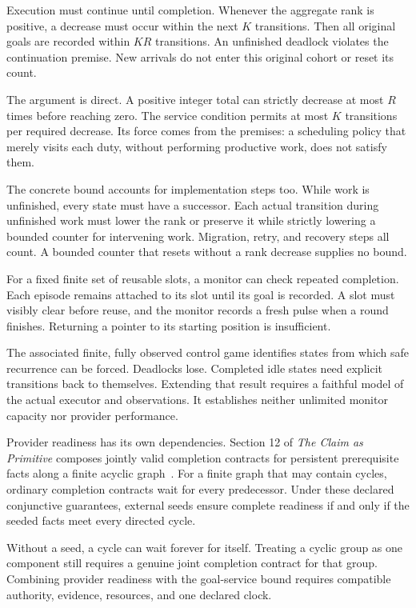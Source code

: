 \documentclass{momentum}
\begin{document}
Execution must continue until completion. Whenever the aggregate rank is positive, a decrease must occur within the next $K$ transitions. Then all original goals are recorded within $KR$ transitions. An unfinished deadlock violates the continuation premise. New arrivals do not enter this original cohort or reset its count.

The argument is direct. A positive integer total can strictly decrease at most $R$ times before reaching zero. The service condition permits at most $K$ transitions per required decrease. Its force comes from the premises: a scheduling policy that merely visits each duty, without performing productive work, does not satisfy them.

The concrete bound accounts for implementation steps too. While work is unfinished, every state must have a successor. Each actual transition during unfinished work must lower the rank or preserve it while strictly lowering a bounded counter for intervening work. Migration, retry, and recovery steps all count. A bounded counter that resets without a rank decrease supplies no bound.

For a fixed finite set of reusable slots, a monitor can check repeated completion. Each episode remains attached to its slot until its goal is recorded. A slot must visibly clear before reuse, and the monitor records a fresh pulse when a round finishes. Returning a pointer to its starting position is insufficient.

The associated finite, fully observed control game identifies states from which safe recurrence can be forced. Deadlocks lose. Completed idle states need explicit transitions back to themselves. Extending that result requires a faithful model of the actual executor and observations. It establishes neither unlimited monitor capacity nor provider performance.

Provider readiness has its own dependencies. Section 12 of \emph{The Claim as Primitive} composes jointly valid completion contracts for persistent prerequisite facts along a finite acyclic graph~\cite{claim}. For a finite graph that may contain cycles, ordinary completion contracts wait for every predecessor. Under these declared conjunctive guarantees, external seeds ensure complete readiness if and only if the seeded facts meet every directed cycle.

Without a seed, a cycle can wait forever for itself. Treating a cyclic group as one component still requires a genuine joint completion contract for that group. Combining provider readiness with the goal-service bound requires compatible authority, evidence, resources, and one declared clock.
\end{document}

